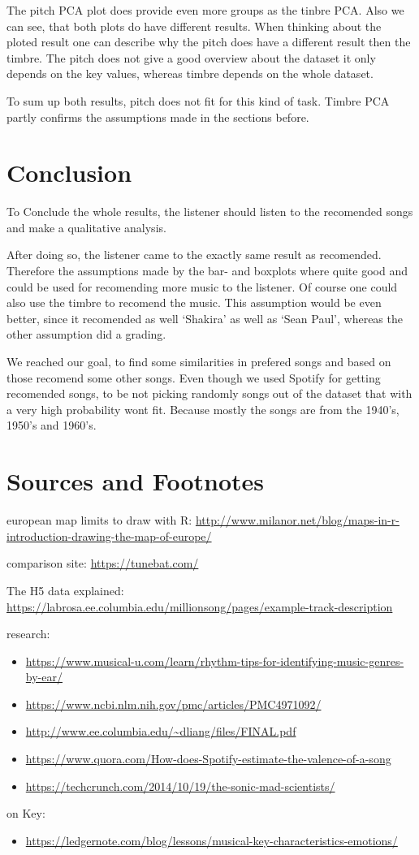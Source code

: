 \documentclass[]{article}
\providecommand{\tightlist}{%
  \setlength{\itemsep}{0pt}\setlength{\parskip}{0pt}}
\begin{document}
The pitch PCA plot does provide even more groups as the tinbre PCA. Also
we can see, that both plots do have different results. When thinking
about the ploted result one can describe why the pitch does have a
different result then the timbre. The pitch does not give a good
overview about the dataset it only depends on the key values, whereas
timbre depends on the whole dataset.

To sum up both results, pitch does not fit for this kind of task. Timbre
PCA partly confirms the assumptions made in the sections before.

\section{Conclusion}\label{conclusion}

To Conclude the whole results, the listener should listen to the
recomended songs and make a qualitative analysis.

After doing so, the listener came to the exactly same result as
recomended. Therefore the assumptions made by the bar- and boxplots
where quite good and could be used for recomending more music to the
listener. Of course one could also use the timbre to recomend the music.
This assumption would be even better, since it recomended as well
`Shakira' as well as `Sean Paul', whereas the other assumption did a
grading.

We reached our goal, to find some similarities in prefered songs and
based on those recomend some other songs. Even though we used Spotify
for getting recomended songs, to be not picking randomly songs out of
the dataset that with a very high probability wont fit. Because mostly
the songs are from the 1940's, 1950's and 1960's.

\section{Sources and Footnotes}\label{sources-and-footnotes}

european map limits to draw with R:
\url{http://www.milanor.net/blog/maps-in-r-introduction-drawing-the-map-of-europe/}

comparison site: \url{https://tunebat.com/}

The H5 data explained:
\url{https://labrosa.ee.columbia.edu/millionsong/pages/example-track-description}

research:

\begin{itemize}
\tightlist
\item
  \url{https://www.musical-u.com/learn/rhythm-tips-for-identifying-music-genres-by-ear/}
\item
  \url{https://www.ncbi.nlm.nih.gov/pmc/articles/PMC4971092/}
\item
  \url{http://www.ee.columbia.edu/~dliang/files/FINAL.pdf}
\item
  \url{https://www.quora.com/How-does-Spotify-estimate-the-valence-of-a-song}
\item
  \url{https://techcrunch.com/2014/10/19/the-sonic-mad-scientists/}
\end{itemize}

on Key:

\begin{itemize}
\tightlist
\item
  \url{https://ledgernote.com/blog/lessons/musical-key-characteristics-emotions/}
\end{itemize}
\end{document}
